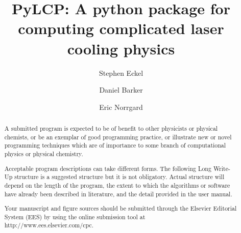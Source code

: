 \documentclass[final,5p,times,twocolumn]{elsarticle}
\begin{document}
\begin{frontmatter}



\title{PyLCP: A python package for computing complicated laser cooling physics}


\author[a]{Stephen Eckel}
\author[a]{Daniel Barker}
\author[a]{Eric Norrgard}

\address[a]{National Institute of Standards and Technology, Sensor Sciences Division, 100 Bureau Dr., Gaithersburg, MD 20899}

\begin{abstract}
A submitted program is expected to be of benefit to other physicists or physical chemists, or be an exemplar of good programming practice, or illustrate new or novel programming techniques which are of importance to some branch of computational physics or physical chemistry.

Acceptable program descriptions can take different forms. The following Long Write-Up structure is a suggested structure but it is not obligatory. Actual structure will depend on the length of the program, the extent to which the algorithms or software have already been described in literature, and the detail provided in the user manual.

Your manuscript and figure sources should be submitted through the Elsevier Editorial System (EES) by using the online submission tool at \\
http://www.ees.elsevier.com/cpc.


\end{abstract}
\end{frontmatter}
\end{document}
